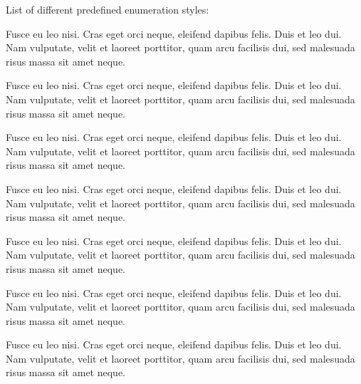 \documentclass[a4paper,german]{tui-algo-seminar}
\begin{document}
List of different predefined enumeration styles:

\begin{theorem}\label{testenv-theorem}
Fusce eu leo nisi. Cras eget orci neque, eleifend dapibus felis. Duis et leo dui. Nam vulputate, velit et laoreet porttitor, quam arcu facilisis dui, sed malesuada risus massa sit amet neque.
\end{theorem}

\begin{lemma}\label{testenv-lemma}
Fusce eu leo nisi. Cras eget orci neque, eleifend dapibus felis. Duis et leo dui. Nam vulputate, velit et laoreet porttitor, quam arcu facilisis dui, sed malesuada risus massa sit amet neque.
\end{lemma}

\begin{corollary}\label{testenv-corollary}
Fusce eu leo nisi. Cras eget orci neque, eleifend dapibus felis. Duis et leo dui. Nam vulputate, velit et laoreet porttitor, quam arcu facilisis dui, sed malesuada risus massa sit amet neque.
\end{corollary}

\begin{proposition}\label{testenv-proposition}
Fusce eu leo nisi. Cras eget orci neque, eleifend dapibus felis. Duis et leo dui. Nam vulputate, velit et laoreet porttitor, quam arcu facilisis dui, sed malesuada risus massa sit amet neque.
\end{proposition}

\begin{conjecture}\label{testenv-conjecture}
Fusce eu leo nisi. Cras eget orci neque, eleifend dapibus felis. Duis et leo dui. Nam vulputate, velit et laoreet porttitor, quam arcu facilisis dui, sed malesuada risus massa sit amet neque.
\end{conjecture}

\begin{observation}\label{testenv-observation}
Fusce eu leo nisi. Cras eget orci neque, eleifend dapibus felis. Duis et leo dui. Nam vulputate, velit et laoreet porttitor, quam arcu facilisis dui, sed malesuada risus massa sit amet neque.
\end{observation}

\begin{exercise}\label{testenv-exercise}
Fusce eu leo nisi. Cras eget orci neque, eleifend dapibus felis. Duis et leo dui. Nam vulputate, velit et laoreet porttitor, quam arcu facilisis dui, sed malesuada risus massa sit amet neque.
\end{exercise}
\end{document}
